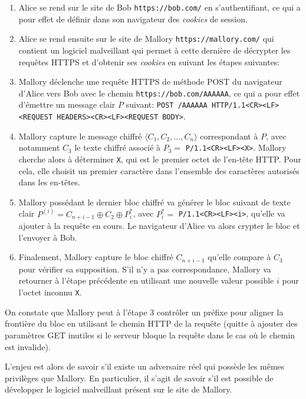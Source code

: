 \documentclass[a4paper,twoside]{article}
\begin{document}
\begin{enumerate}
    \item Alice se rend sur le site de Bob \texttt{https://bob.com/} en
	s'authentifiant, ce qui a pour effet de définir dans son navigateur
	des \emph{cookies} de session.
    \item Alice se rend ensuite sur le site de Mallory
	\texttt{https://mallory.com/} qui contient un logiciel malveillant
	qui permet à cette dernière de décrypter les requêtes HTTPS et
	d'obtenir ses \emph{cookies} en suivant les étapes suivantes:
    \item Mallory déclenche une requête HTTPS de méthode POST du navigateur
	d'Alice vers Bob avec le chemin \texttt{https://bob.com/AAAAAA}, ce
	qui a pour effet d'émettre un message clair $P$ suivant: \texttt{POST
	/AAAAAA HTTP/1.1<CR><LF><REQUEST HEADERS><CR><LF><REQUEST BODY>}. 
    \item Mallory capture le message chiffré $\langle C_1, C_2, \ldots, C_n
	\rangle$ correspondant à $P$, avec notamment $C_3$ le texte
	chiffré
	associé à $P_3 =$ \texttt{P/1.1<CR><LF><X>}. Mallory cherche alors à
	déterminer \texttt{X}, qui est le premier octet de l'en-tête HTTP.
	Pour cela, elle choisit un premier caractère dans l'ensemble des
	caractères autorisés dans les en-têtes.
    \item Mallory possédant le dernier bloc chiffré va générer
	le bloc suivant de texte clair $P^{(i)} = C_{n+i-1}\oplus
	C_2\oplus P^*_i$, avec $P^*_i =$ \texttt{P/1.1<CR><LF><i>}, qu'elle
	va ajouter à la requête en cours. Le navigateur d'Alice va alors
	crypter le bloc et l'envoyer à Bob.
    \item Finalement, Mallory capture le bloc chiffré $C_{n+i-1}$ qu'elle
	compare à $C_3$ pour vérifier sa supposition. S'il n'y a pas
	correspondance, Mallory va retourner à l'étape précédente en
	utilisant une nouvelle valeur possible $i$ pour l'octet inconnu
	\texttt{X}.
\end{enumerate}

On constate que Mallory peut à l'étape 3 contrôler un préfixe pour aligner
la frontière du bloc en utilisant le chemin HTTP de la requête (quitte à
ajouter des paramètres GET inutiles si le serveur bloque la requête dans le
cas où le chemin est invalide).

L'enjeu est alors de savoir s'il existe un adversaire réel qui possède les
mêmes privilèges que Mallory. En particulier, il s'agit de savoir s'il est
possible de développer le logiciel malveillant présent sur le site de
Mallory.
\end{document}
